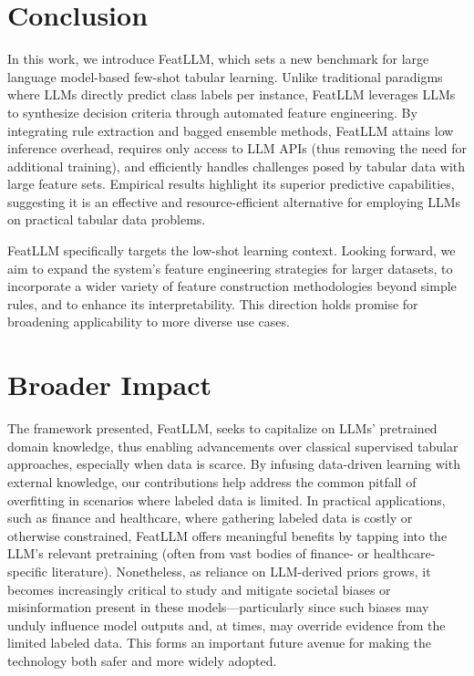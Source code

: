 \section{Conclusion}
In this work, we introduce \textsf{FeatLLM}, which sets a new benchmark for large language model-based few-shot tabular learning. Unlike traditional paradigms where LLMs directly predict class labels per instance, \textsf{FeatLLM} leverages LLMs to synthesize decision criteria through automated feature engineering. By integrating rule extraction and bagged ensemble methods, \textsf{FeatLLM} attains low inference overhead, requires only access to LLM APIs (thus removing the need for additional training), and efficiently handles challenges posed by tabular data with large feature sets. Empirical results highlight its superior predictive capabilities, suggesting it is an effective and resource-efficient alternative for employing LLMs on practical tabular data problems.

\textsf{FeatLLM} specifically targets the low-shot learning context. Looking forward, we aim to expand the system’s feature engineering strategies for larger datasets, to incorporate a wider variety of feature construction methodologies beyond simple rules, and to enhance its interpretability. This direction holds promise for broadening applicability to more diverse use cases.  

\section{Broader Impact}
The framework presented, \textsf{FeatLLM}, seeks to capitalize on LLMs’ pretrained domain knowledge, thus enabling advancements over classical supervised tabular approaches, especially when data is scarce. By infusing data-driven learning with external knowledge, our contributions help address the common pitfall of overfitting in scenarios where labeled data is limited. In practical applications, such as finance and healthcare, where gathering labeled data is costly or otherwise constrained, \textsf{FeatLLM} offers meaningful benefits by tapping into the LLM’s relevant pretraining (often from vast bodies of finance- or healthcare-specific literature). Nonetheless, as reliance on LLM-derived priors grows, it becomes increasingly critical to study and mitigate societal biases or misinformation present in these models—particularly since such biases may unduly influence model outputs and, at times, may override evidence from the limited labeled data. This forms an important future avenue for making the technology both safer and more widely adopted.

